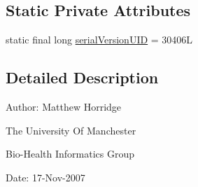 \subsection*{Static Private Attributes}
\begin{DoxyCompactItemize}
\item 
static final long \hyperlink{classorg_1_1semanticweb_1_1owlapi_1_1io_1_1_o_w_l_ontology_input_source_exception_a1bbedb2d49d0795526a0015e87bad39b}{serial\-Version\-U\-I\-D} = 30406\-L
\end{DoxyCompactItemize}


\subsection{Detailed Description}
Author\-: Matthew Horridge\par
 The University Of Manchester\par
 Bio-\/\-Health Informatics Group\par
 Date\-: 17-\/\-Nov-\/2007\par
\par
 


